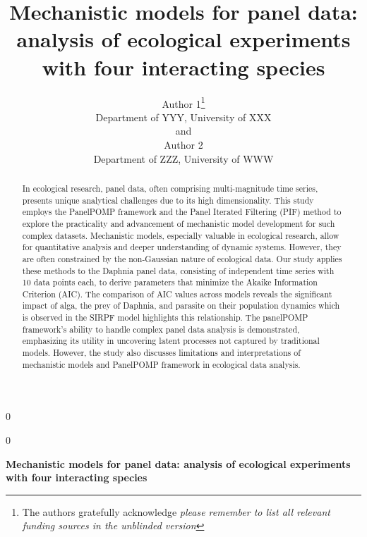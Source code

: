 \documentclass[12pt]{article}
\newcommand{\blind}{0}
\begin{document}

\def\spacingset#1{\renewcommand{\baselinestretch}%
{#1}\small\normalsize} \spacingset{1}


\blind
{
  \title{\bf Mechanistic models for panel data: analysis of ecological experiments with four interacting species}
  \author{Author 1\thanks{
    The authors gratefully acknowledge \textit{please remember to list all relevant funding sources in the unblinded version}}\hspace{.2cm}\\
    Department of YYY, University of XXX\\
    and \\
    Author 2 \\
    Department of ZZZ, University of WWW}
  \maketitle
} \fi

\blind
{
  \bigskip
  \bigskip
  \bigskip
  \begin{center}
    {\LARGE\bf Mechanistic models for panel data: analysis of ecological experiments with four interacting species}
\end{center}
  \medskip
} \fi




\bigskip
\begin{abstract}
In ecological research, panel data, often comprising multi-magnitude time series, presents unique analytical challenges due to its high dimensionality. This study employs the PanelPOMP framework and the Panel Iterated Filtering (PIF) method to explore the practicality and advancement of mechanistic model development for such complex datasets. Mechanistic models, especially valuable in ecological research, allow for quantitative analysis and deeper understanding of dynamic systems. However, they are often constrained by the non-Gaussian nature of ecological data. Our study applies these methods to the Daphnia panel data, consisting of independent time series with 10 data points each, to derive parameters that minimize the Akaike Information Criterion (AIC). The comparison of AIC values across models reveals the significant impact of alga, the prey of Daphnia, and parasite on their population dynamics which is observed in the SIRPF model highlights this relationship. The panelPOMP framework's ability to handle complex panel data analysis is demonstrated, emphasizing its utility in uncovering latent processes not captured by traditional models. However, the study also discusses limitations and interpretations of mechanistic models and PanelPOMP framework in ecological data analysis.
\end{abstract}
\end{document}
